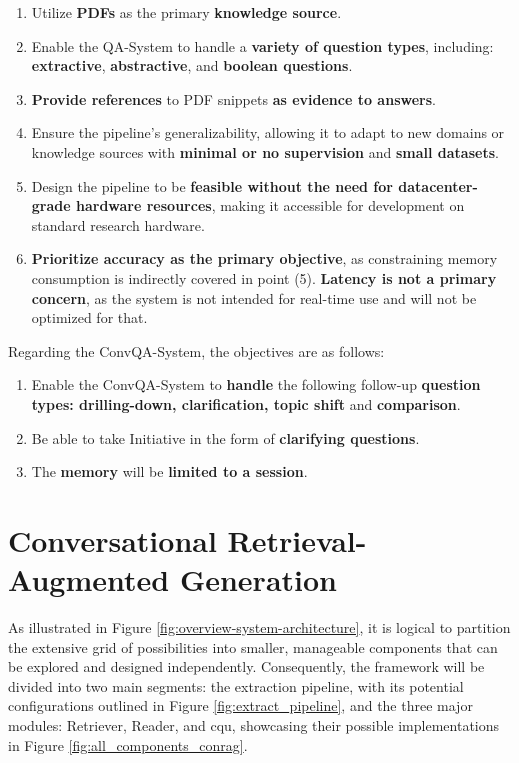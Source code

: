 \begin{enumerate}
    \item Utilize \textbf{PDFs} as the primary \textbf{knowledge source}.
    \item Enable the QA-System to handle a \textbf{variety of question types}, including: \textbf{extractive}, \textbf{abstractive}, and \textbf{boolean questions}.
    \item \textbf{Provide references} to PDF snippets \textbf{as evidence to answers}.
    \item Ensure the pipeline's generalizability, allowing it to adapt to new domains or knowledge sources with \textbf{minimal or no supervision} and \textbf{small datasets}.
    \item Design the pipeline to be \textbf{feasible without the need for datacenter-grade hardware resources}, making it accessible for development on standard research hardware.
    \item \textbf{Prioritize accuracy as the primary objective}, as constraining memory consumption is indirectly covered in point (5). \textbf{Latency is not a primary concern}, as the system is not intended for real-time use and will not be optimized for that.
\end{enumerate}


Regarding the ConvQA-System, the objectives are as follows:

\begin{enumerate}
    \item Enable the ConvQA-System to \textbf{handle} the following follow-up \textbf{question types: drilling-down, clarification, topic shift} and \textbf{comparison}.
    \item Be able to take Initiative in the form of \textbf{clarifying questions}.
    \item The \textbf{memory} will be \textbf{limited to a session}.
\end{enumerate}

\section{Conversational Retrieval-Augmented Generation}
\label{sec:conrag}

As illustrated in Figure \ref{fig:overview-system-architecture}, it is logical to partition the extensive grid of possibilities into smaller, manageable components that can be explored and designed independently. Consequently, the framework will be divided into two main segments: the extraction pipeline, with its potential configurations outlined in Figure \ref{fig:extract_pipeline}, and the three major modules: Retriever, Reader, and \gls{cqu}, showcasing their possible implementations in Figure \ref{fig:all_components_conrag}.

